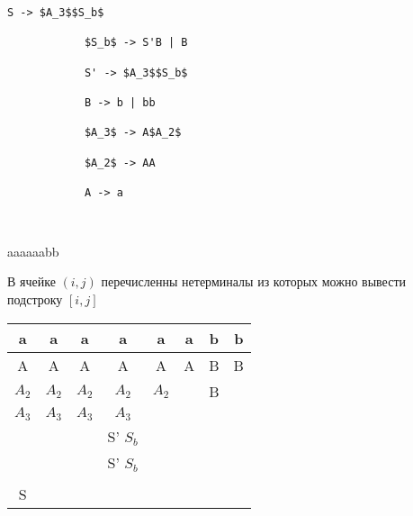 \documentclass[12pt]{article}
\begin{document}
\begin{enumerate}
\begin{lstlisting}[language=Lambda]
            S -> $A_3$$S_b$

            $S_b$ -> S'B | B

            S' -> $A_3$$S_b$ 

            B -> b | bb

            $A_3$ -> A$A_2$

            $A_2$ -> AA

            A -> a

            
            \end{lstlisting}


            aaaaaabb

            В ячейке $(i, j)$ перечисленны нетерминалы из которых можно вывести подстроку $[i, j]$

             \begin{tabular}{ |c|c|c|c|c|c|c|c| } 
             \hline
             a & a & a & a & a & a & b & b\\ 
             \hline
             \hline
             A & A & A & A & A & A & B & B \\
             \hline
             $A_2$ & $A_2$ & $A_2$ & $A_2$ & $A_2$ &  & B &  \\
             \hline
             $A_3$ & $A_3$ & $A_3$ & $A_3$ &  &  &  &  \\
             \hline
              & &  & S' $S_b$ & & &  &  \\
             \hline
              &  &  & S' $S_b$ &  &  &  &  \\
             \hline
              &  &  &  & &  &  &  \\
             \hline
              S &  &  &  &  &  & &  \\
             \hline
            \end{tabular}           


	\end{enumerate}
\end{document}
